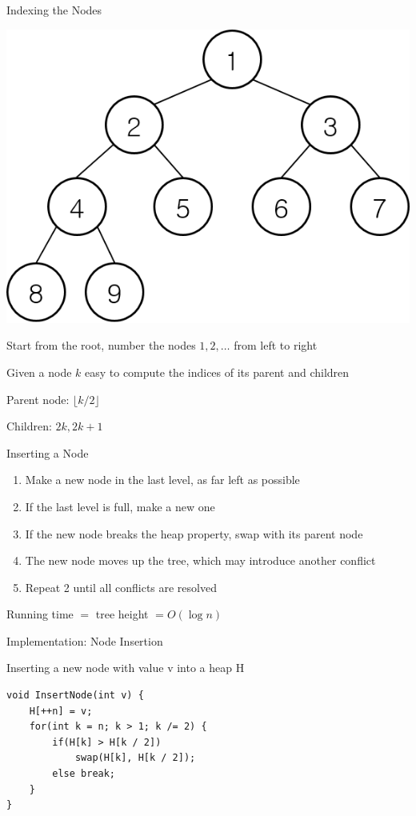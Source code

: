 \documentclass[13pt,onlymath]{beamer}
\begin{document}
\begin{frame}{Indexing the Nodes}
\begin{center}
\includegraphics[height=0.4\textheight]{figures/heap_index}
\end{center}
\BIT
\item Start from the root, number the nodes $1, 2, \ldots$ from left to right
\item Given a node $k$ easy to compute the indices of its parent and children
\BIT
\item Parent node: $\lfloor k/2 \rfloor$
\item Children: $2k, 2k+1$
\EIT
\EIT
\end{frame}

\begin{frame}{Inserting a Node}
\begin{enumerate}
\item Make a new node in the last level, as far left as possible
\BIT
\item If the last level is full, make a new one
\EIT
\item If the new node breaks the heap property, swap with its parent node
\BIT
\item The new node moves up the tree, which may introduce another conflict
\EIT
\item Repeat 2 until all conflicts are resolved
\end{enumerate}
\BIT
\item Running time $=$ tree height $= O(\log n)$
\EIT
\end{frame}

\begin{frame}[fragile]{Implementation: Node Insertion}
\BIT
\item Inserting a new node with value v into a heap H
\EIT
\begin{Verbatim}[xleftmargin=25pt]
void InsertNode(int v) {
    H[++n] = v;
    for(int k = n; k > 1; k /= 2) {
        if(H[k] > H[k / 2])
            swap(H[k], H[k / 2]);
        else break;
    }
}
\end{Verbatim}
\end{frame}
\end{document}
